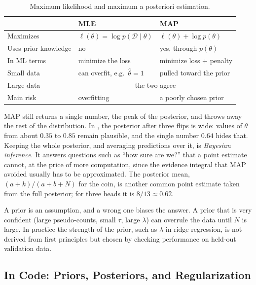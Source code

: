 \begin{table}[ht]
  \centering
  \small
  \caption{Maximum likelihood and maximum a posteriori estimation.}
  \label{tab:ch06-mle-map}
  \begin{tabular}{@{}lll@{}}
    \toprule
    & MLE & MAP \\
    \midrule
    Maximizes & $\ell(\theta) = \log p(\mathcal{D} \mid \theta)$
      & $\ell(\theta) + \log p(\theta)$ \\
    Uses prior knowledge & no & yes, through $p(\theta)$ \\
    In ML terms & minimize the loss & minimize loss $+$ penalty \\
    Small data & can overfit, e.g.\ $\hat\theta = 1$ & pulled toward the prior \\
    Large data & \multicolumn{2}{c}{the two agree} \\
    Main risk & overfitting & a poorly chosen prior \\
    \bottomrule
  \end{tabular}
\end{table}

MAP still returns a single number, the peak of the posterior, and throws
away the rest of the distribution. In , the posterior
after three flips is wide: values of $\theta$ from about $0.35$ to $0.85$
remain plausible, and the single number $0.64$ hides that. Keeping the
whole posterior, and averaging predictions over it, is \emph{Bayesian
inference}. It answers questions such as ``how sure are we?'' that a
point estimate cannot, at the price of more computation, since the
evidence integral that MAP avoided usually has to be approximated. The
posterior mean, $(a + k)/(a + b + N)$ for the coin, is another common
point estimate taken from the full posterior; for three heads it is
$8/13 \approx 0.62$.

\begin{warning}
  A prior is an assumption, and a wrong one biases the answer. A prior
  that is very confident (large pseudo-counts, small $\tau$, large
  $\lambda$) can overrule the data until $N$ is large. In practice the
  strength of the prior, such as $\lambda$ in ridge regression, is not
  derived from first principles but chosen by checking performance on
  held-out validation data.
\end{warning}

\subsection{In Code: Priors, Posteriors, and Regularization}
\label{sec:ch06-map-code}

